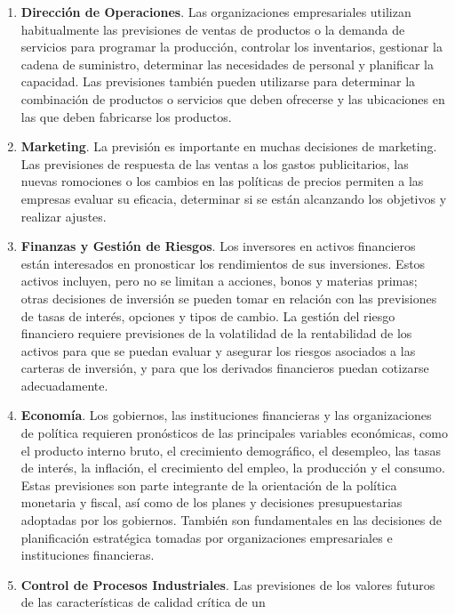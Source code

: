 \documentclass[12pt,]{krantz}
\theoremstyle{definition}
\theoremstyle{definition}
\theoremstyle{definition}
\theoremstyle{remark}
\begin{document}
\begin{enumerate}
\def\labelenumi{\arabic{enumi})}
\item
  \textbf{Dirección de Operaciones}. Las organizaciones empresariales
  utilizan habitualmente las previsiones de ventas de productos o la
  demanda de servicios para programar la producción, controlar los
  inventarios, gestionar la cadena de suministro, determinar las
  necesidades de personal y planificar la capacidad. Las previsiones
  también pueden utilizarse para determinar la combinación de productos
  o servicios que deben ofrecerse y las ubicaciones en las que deben
  fabricarse los productos.
\item
  \textbf{Marketing}. La previsión es importante en muchas decisiones de
  marketing. Las previsiones de respuesta de las ventas a los gastos
  publicitarios, las nuevas romociones o los cambios en las políticas de
  precios permiten a las empresas evaluar su eficacia, determinar si se
  están alcanzando los objetivos y realizar ajustes.
\item
  \textbf{Finanzas y Gestión de Riesgos}. Los inversores en activos
  financieros están interesados en pronosticar los rendimientos de sus
  inversiones. Estos activos incluyen, pero no se limitan a acciones,
  bonos y materias primas; otras decisiones de inversión se pueden tomar
  en relación con las previsiones de tasas de interés, opciones y tipos
  de cambio. La gestión del riesgo financiero requiere previsiones de la
  volatilidad de la rentabilidad de los activos para que se puedan
  evaluar y asegurar los riesgos asociados a las carteras de inversión,
  y para que los derivados financieros puedan cotizarse adecuadamente.
\item
  \textbf{Economía}. Los gobiernos, las instituciones financieras y las
  organizaciones de política requieren pronósticos de las principales
  variables económicas, como el producto interno bruto, el crecimiento
  demográfico, el desempleo, las tasas de interés, la inflación, el
  crecimiento del empleo, la producción y el consumo. Estas previsiones
  son parte integrante de la orientación de la política monetaria y
  fiscal, así como de los planes y decisiones presupuestarias adoptadas
  por los gobiernos. También son fundamentales en las decisiones de
  planificación estratégica tomadas por organizaciones empresariales e
  instituciones financieras.
\item
  \textbf{Control de Procesos Industriales}. Las previsiones de los
  valores futuros de las características de calidad crítica de un

\end{enumerate}
\end{document}
